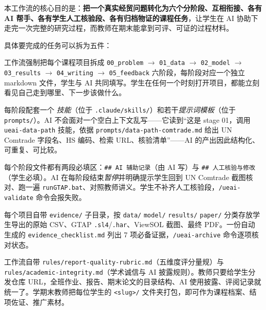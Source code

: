 \documentclass[12pt,a4paper]{article}
\begin{document}
本工作流的核心目的是：\textbf{把一个真实经贸问题转化为六个分阶段、互相衔接、各有 AI 帮手、各有学生人工核验段、各有归档物证的课程任务}，让学生在 AI 协助下走完一次完整的研究过程，而教师在期末能拿到可评、可证的过程材料。

具体要完成的任务可以拆为五件：

\begin{solutionbox}
工作流强制把每个课程项目拆成 \texttt{00\_problem} $\rightarrow$ \texttt{01\_data} $\rightarrow$ \texttt{02\_model} $\rightarrow$ \texttt{03\_results} $\rightarrow$ \texttt{04\_writing} $\rightarrow$ \texttt{05\_feedback} 六阶段，每阶段对应一个独立 markdown 文件，学生与 AI 共同填写。学生在任何一个时刻打开项目，都能立刻看见自己走到哪里、下一步该做什么。
\end{solutionbox}

\begin{solutionbox}
每阶段配套一个 \emph{技能}（位于 \texttt{.claude/skills/}）和若干\emph{提示词模板}（位于 \texttt{prompts/}）。AI 不会面对一个空白上下文乱写——它读到``这是 stage 01，调用 \texttt{ueai-data-path} 技能，依据 \texttt{prompts/data-path-comtrade.md} 给出 UN Comtrade 字段名、HS 编码、检索 URL、核验清单''——AI 的产出因此结构化、可重复、可比较。
\end{solutionbox}

\begin{solutionbox}[任务 3：强制学生在每个阶段做人工核验]
每个阶段文件都有两段必填区：\texttt{\#\# AI 辅助记录}（由 AI 写）与 \texttt{\#\# 人工核验与修改}（学生必填）。AI 在每阶段结束\emph{暂停}并明确提示学生回到 UN Comtrade 截图核对、跑一遍 \texttt{runGTAP.bat}、对照教师讲义。学生不补齐人工核验段，\texttt{/ueai-validate} 命令会报失败。
\end{solutionbox}

\begin{solutionbox}
每个项目自带 \texttt{evidence/} 子目录，按 \texttt{data/} \texttt{model/} \texttt{results/} \texttt{paper/} 分类存放学生导出的原始 CSV、GTAP \texttt{.sl4}/\texttt{.har}、ViewSOL 截图、最终 PDF。一份自动生成的 \texttt{evidence\_checklist.md} 列出 7 项必备证据，\texttt{/ueai-archive} 命令逐项核对状态。
\end{solutionbox}

\begin{solutionbox}
工作流自带 \texttt{rules/report-quality-rubric.md}（五维度评分量规）与 \texttt{rules/academic-integrity.md}（学术诚信与 AI 披露规则）。教师只要给学生分发仓库 URL，全班作业、报告、期末论文的目录结构、AI 使用披露、评阅记录就统一了。学期末教师把每位学生的 \texttt{<slug>/} 文件夹打包，即可作为课程档案、结项佐证、推广素材。
\end{solutionbox}
\end{document}
